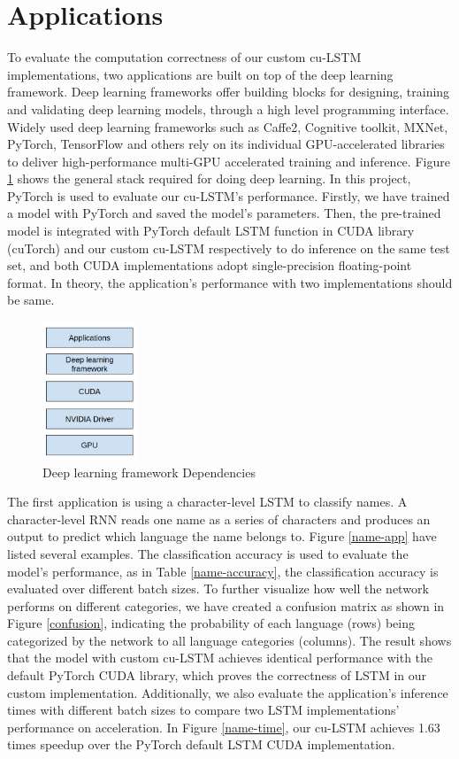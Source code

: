\documentclass{article}
\begin{document}
\section{Applications}

To evaluate the computation correctness of our custom cu-LSTM implementations,  two applications are built on top of the deep learning framework. Deep learning frameworks offer building blocks for designing, training and validating deep learning models, through a high level programming interface. Widely used deep learning frameworks such as Caffe2, Cognitive toolkit, MXNet, PyTorch, TensorFlow  and others rely on its individual GPU-accelerated libraries to deliver high-performance multi-GPU accelerated training and inference. Figure \ref{framework} shows the general stack required for doing deep learning. In this project, PyTorch is used to evaluate our cu-LSTM's performance. Firstly, we have trained a model with PyTorch and saved the model's parameters. Then, the pre-trained model is integrated with PyTorch default LSTM function in CUDA library (cuTorch) and our custom cu-LSTM respectively to do inference on the same test set, and both CUDA implementations adopt single-precision floating-point format. In theory, the application's performance with two implementations should be same.

\begin{figure}[H]
\centering
\includegraphics[width=0.25\textwidth]{dependencies.png}
\caption{Deep learning framework Dependencies}
\label{framework}
\end{figure}

The first application is using a character-level LSTM to classify names. A character-level RNN reads one name as a series of characters and produces an output to predict which language the name belongs to. Figure \ref{name-app} have listed several examples. The classification accuracy is used to evaluate the model's performance, as in Table \ref{name-accuracy}, the classification accuracy is evaluated over different batch sizes. To further visualize how well the network performs on different categories,  we have created a confusion matrix as shown in Figure \ref{confusion}, indicating the probability of each language (rows) being categorized by the network to all language categories (columns). The result shows that the model with custom cu-LSTM achieves identical performance with the default PyTorch CUDA library, which proves the correctness of  LSTM in our custom implementation. Additionally, we also evaluate the application's inference times with different batch sizes to compare two LSTM implementations' performance on acceleration. In Figure \ref{name-time}, our cu-LSTM achieves 1.63 times speedup over the PyTorch default LSTM CUDA implementation.
\end{document}
